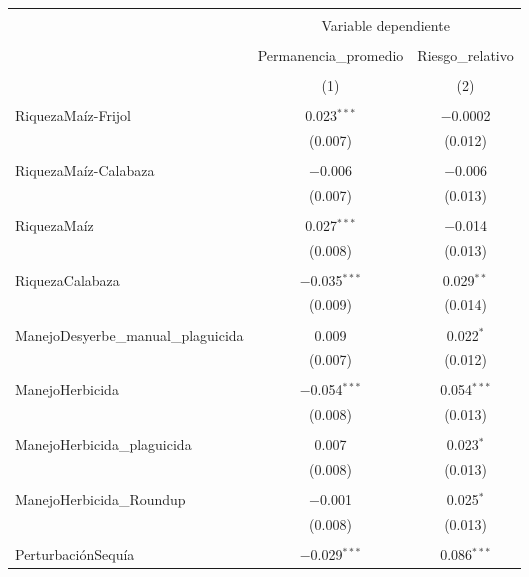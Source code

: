 \documentclass[spanish,11pt]{article}
\begin{document}
\begin{table}[!htbp] \centering 
  \caption{} 
  \label{} 
\begin{tabular}{@{\extracolsep{5pt}}lcc} 
\\[-1.8ex]\hline 
\hline \\[-1.8ex] 
 & \multicolumn{2}{c}{Variable dependiente} \\ 
\cline{2-3} 
\\[-1.8ex] & Permanencia\_promedio & Riesgo\_relativo \\ 
\\[-1.8ex] & (1) & (2)\\ 
\hline \\[-1.8ex] 
 RiquezaMaíz-Frijol & 0.023$^{***}$ & $-$0.0002 \\ 
  & (0.007) & (0.012) \\ 
  & & \\ 
 RiquezaMaíz-Calabaza & $-$0.006 & $-$0.006 \\ 
  & (0.007) & (0.013) \\ 
  & & \\ 
 RiquezaMaíz & 0.027$^{***}$ & $-$0.014 \\ 
  & (0.008) & (0.013) \\ 
  & & \\ 
 RiquezaCalabaza & $-$0.035$^{***}$ & 0.029$^{**}$ \\ 
  & (0.009) & (0.014) \\ 
  & & \\ 
 ManejoDesyerbe\_manual\_plaguicida & 0.009 & 0.022$^{*}$ \\ 
  & (0.007) & (0.012) \\ 
  & & \\ 
 ManejoHerbicida & $-$0.054$^{***}$ & 0.054$^{***}$ \\ 
  & (0.008) & (0.013) \\ 
  & & \\ 
 ManejoHerbicida\_plaguicida & 0.007 & 0.023$^{*}$ \\ 
  & (0.008) & (0.013) \\ 
  & & \\ 
 ManejoHerbicida\_Roundup & $-$0.001 & 0.025$^{*}$ \\ 
  & (0.008) & (0.013) \\ 
  & & \\ 
 PerturbaciónSequía & $-$0.029$^{***}$ & 0.086$^{***}$ \\ 

\end{tabular}
\end{table}
\end{document}
